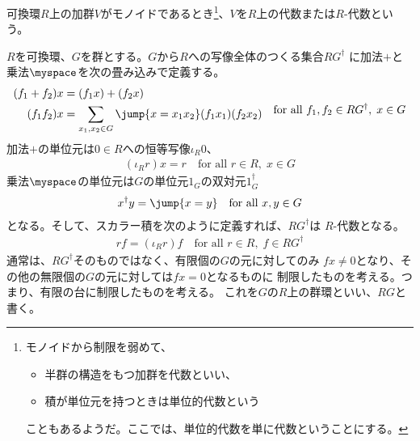	\begin{definition}[環上の代数]\label{def:環上の代数} %
		可換環$R$上の加群$V$がモノイドであるとき\footnote{
			モノイドから制限を弱めて、
			\begin{itemize}\setlength{\itemsep}{-1mm} %
				\item 半群の構造をもつ加群を代数といい、
				\item 積が単位元を持つときは単位的代数という
			\end{itemize} %
			こともあるようだ。ここでは、単位的代数を単に代数ということにする。
		}、$V$を$R$上の代数または$R$-代数という。
	\end{definition} %

	\begin{definition}[群環]\label{def:群環} %
		$R$を可換環、$G$を群とする。$G$から$R$への写像全体のつくる集合$RG^\dag$
		に加法$+$と乗法$\myspace$を次の畳み込みで定義する。
		\begin{equation*}\begin{split} %
			(f_1+f_2)x &= (f_1x) + (f_2x) \\
			(f_1f_2)x &= \sum_{x_1,x_2\in G}\jump{x=x_1x_2}(f_1x_1)(f_2x_2) \\
		\end{split}
			\quad\text{for all }f_1,f_2\in RG^\dag,\;x\in G
		\end{equation*} %
		加法$+$の単位元は$0\in R$への恒等写像$\iota_R0$、
		\begin{equation*}\begin{split} %
			(\iota_Rr)x = r \quad\text{for all }r\in R,\;x\in G
		\end{split}\end{equation*} %
		乗法$\myspace$の単位元は$G$の単位元$1_G$の双対元$1_G^\dag$
		\begin{equation*}\begin{split} %
			x^\dag y = \jump{x=y} \quad\text{for all }x,y\in G
		\end{split}\end{equation*} %
		となる。そして、スカラー積を次のように定義すれば、$RG^\dag$は
		$R$-代数となる。
		\begin{equation*}\begin{split} %
			rf = (\iota_Rr)f \quad\text{for all }r\in R,\;f\in RG^\dag
		\end{split}\end{equation*} %
		通常は、$RG^\dag$そのものではなく、有限個の$G$の元に対してのみ
		$fx\neq0$となり、その他の無限個の$G$の元に対しては$fx=0$となるものに
		制限したものを考える。つまり、有限の台に制限したものを考える。
		これを$G$の$R$上の群環といい、$RG$と書く。
	\end{definition} %

